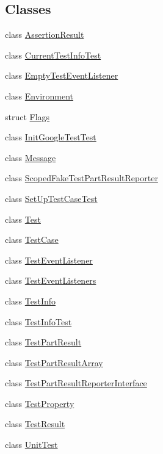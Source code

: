\subsection*{Classes}
\begin{DoxyCompactItemize}
\item 
class \hyperlink{classtesting_1_1_assertion_result}{Assertion\+Result}
\item 
class \hyperlink{classtesting_1_1_current_test_info_test}{Current\+Test\+Info\+Test}
\item 
class \hyperlink{classtesting_1_1_empty_test_event_listener}{Empty\+Test\+Event\+Listener}
\item 
class \hyperlink{classtesting_1_1_environment}{Environment}
\item 
struct \hyperlink{structtesting_1_1_flags}{Flags}
\item 
class \hyperlink{classtesting_1_1_init_google_test_test}{Init\+Google\+Test\+Test}
\item 
class \hyperlink{classtesting_1_1_message}{Message}
\item 
class \hyperlink{classtesting_1_1_scoped_fake_test_part_result_reporter}{Scoped\+Fake\+Test\+Part\+Result\+Reporter}
\item 
class \hyperlink{classtesting_1_1_set_up_test_case_test}{Set\+Up\+Test\+Case\+Test}
\item 
class \hyperlink{classtesting_1_1_test}{Test}
\item 
class \hyperlink{classtesting_1_1_test_case}{Test\+Case}
\item 
class \hyperlink{classtesting_1_1_test_event_listener}{Test\+Event\+Listener}
\item 
class \hyperlink{classtesting_1_1_test_event_listeners}{Test\+Event\+Listeners}
\item 
class \hyperlink{classtesting_1_1_test_info}{Test\+Info}
\item 
class \hyperlink{classtesting_1_1_test_info_test}{Test\+Info\+Test}
\item 
class \hyperlink{classtesting_1_1_test_part_result}{Test\+Part\+Result}
\item 
class \hyperlink{classtesting_1_1_test_part_result_array}{Test\+Part\+Result\+Array}
\item 
class \hyperlink{classtesting_1_1_test_part_result_reporter_interface}{Test\+Part\+Result\+Reporter\+Interface}
\item 
class \hyperlink{classtesting_1_1_test_property}{Test\+Property}
\item 
class \hyperlink{classtesting_1_1_test_result}{Test\+Result}
\item 
class \hyperlink{classtesting_1_1_unit_test}{Unit\+Test}
\end{DoxyCompactItemize}
